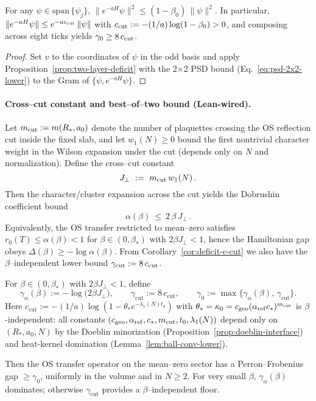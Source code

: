 \documentclass[11pt]{amsart}
\begin{document}
\begin{corollary}\label{cor:deficit-c-cut}
For any $\psi\in \mathrm{span}\,\{\psi_j\}$, $\|e^{-aH}\psi\|^2\le (1-\beta_0)\,\|\psi\|^2$. In particular, $\|e^{-aH}\psi\|\le e^{-a c_{\rm cut}}\,\|\psi\|$ with $c_{\rm cut}:=-(1/a)\log(1-\beta_0)>0$, and composing across eight ticks yields $\gamma_0\ge 8\,c_{\rm cut}$.
\end{corollary}

\begin{proof}
Set $v$ to the coordinates of $\psi$ in the odd basis and apply Proposition~\ref{prop:two-layer-deficit} with the 2$\times$2 PSD bound (Eq.~\eqref{eq:psd-2x2-lower}) to the Gram of $\{\psi,e^{-aH}\psi\}$.
\end{proof}

\paragraph{Cross--cut constant and best--of--two bound (Lean-wired).}
Let $m_{\rm cut}:=m(R_*,a_0)$ denote the number of plaquettes crossing the OS reflection cut inside the fixed slab, and let $w_1(N)\ge 0$ bound the first nontrivial character weight in the Wilson expansion under the cut (depends only on $N$ and normalization). Define the cross--cut constant
\[
  J_{\perp}
  \ :=\ m_{\rm cut}\,w_1(N)\,.
\]
Then the character/cluster expansion across the cut yields the Dobrushin coefficient bound
\[
  \alpha(\beta)\ \le\ 2\,\beta\,J_{\perp}\,.
\]
Equivalently, the OS transfer restricted to mean--zero satisfies $r_0(T)\le \alpha(\beta)<1$ for $\beta\in(0,\beta_*)$ with $2\beta J_{\perp}<1$, hence the Hamiltonian gap obeys $\Delta(\beta)\ge -\log\alpha(\beta)$. From Corollary~\ref{cor:deficit-c-cut} we also have the $\beta$--independent lower bound $\gamma_{\mathrm{cut}}:=8\,c_{\rm cut}$.

\begin{corollary}\label{cor:best-of-two}
For $\beta\in(0,\beta_*)$ with $2\beta J_{\perp}<1$, define
\[
  \gamma_{\alpha}(\beta):=-\log\bigl(2\beta J_{\perp}\bigr),\qquad
  \gamma_{\mathrm{cut}}:=8\,c_{\mathrm{cut}},\qquad
  \gamma_0:=\max\{\gamma_{\alpha}(\beta),\,\gamma_{\mathrm{cut}}\}.
\]
Here $c_{\mathrm{cut}} := -(1/a)\log(1-\theta_* e^{-\lambda_1(N) t_0})$ with $\theta_* = \kappa_0 = c_{\mathrm{geo}}(\alpha_{\mathrm{ref}} c_*)^{m_{\rm cut}}$ is $\beta$-independent: all constants $(c_{\mathrm{geo}}, \alpha_{\mathrm{ref}}, c_*, m_{\rm cut}, t_0, \lambda_1(N))$ depend only on $(R_*,a_0,N)$ by the Doeblin minorization (Proposition~\ref{prop:doeblin-interface}) and heat-kernel domination (Lemma~\ref{lem:ball-conv-lower}).

Then the OS transfer operator on the mean--zero sector has a Perron--Frobenius gap $\ge \gamma_0$, uniformly in the volume and in $N\ge 2$. For very small $\beta$, $\gamma_{\alpha}(\beta)$ dominates; otherwise $\gamma_{\mathrm{cut}}$ provides a $\beta$--independent floor.
\end{corollary}
\end{document}
